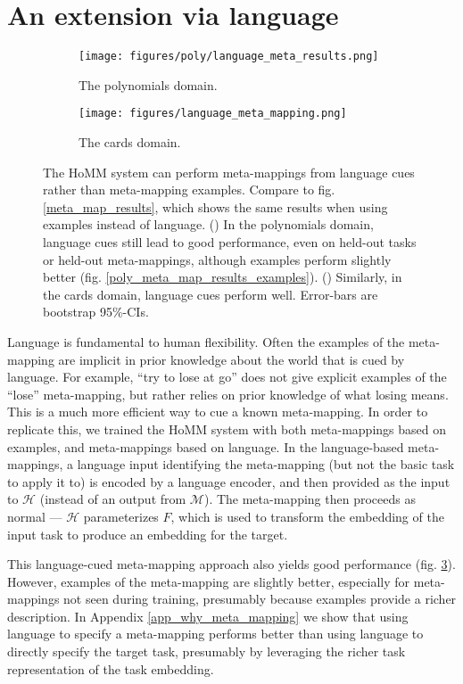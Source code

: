 \documentclass{article}
\begin{document}
\section{An extension via language}
\begin{figure}
\centering
\begin{subfigure}{0.5\textwidth}
\texttt{[image: figures/poly/language\_meta\_results.png]}
\caption{The polynomials domain.}
\label{poly_meta_map_results_language}
\end{subfigure}%
\begin{subfigure}{0.5\textwidth}
\texttt{[image: figures/language\_meta\_mapping.png]}
\caption{The cards domain.}
\label{cards_meta_map_results_language}
\end{subfigure}
\caption{The HoMM system can perform meta-mappings from language cues rather than meta-mapping examples. Compare to fig. \ref{meta_map_results}, which shows the same results when using examples instead of language. () In the polynomials domain, language cues still lead to good performance, even on held-out tasks or held-out meta-mappings, although examples perform slightly better (fig. \ref{poly_meta_map_results_examples}). () Similarly, in the cards domain, language cues perform well. Error-bars are bootstrap 95\%-CIs.}
\label{language_meta_map_results}
\end{figure}
Language is fundamental to human flexibility. Often the examples of the meta-mapping are implicit in prior knowledge about the world that is cued by language. For example, ``try to lose at go'' does not give explicit examples of the ``lose'' meta-mapping, but rather relies on prior knowledge of what losing means. This is a much more efficient way to cue a known meta-mapping. In order to replicate this, we trained the HoMM system with both meta-mappings based on examples, and meta-mappings based on language. In the language-based meta-mappings, a language input identifying the meta-mapping (but not the basic task to apply it to) is encoded by a language encoder, and then provided as the input to $\mathcal{H}$ (instead of an output from $\mathcal{M}$). The meta-mapping then proceeds as normal --- $\mathcal{H}$ parameterizes $F$, which is used to transform the embedding of the input task to produce an embedding for the target. \par
This language-cued meta-mapping approach also yields good performance (fig. \ref{language_meta_map_results}). However, examples of the meta-mapping are slightly better, especially for meta-mappings not seen during training, presumably because examples provide a richer description. In Appendix \ref{app_why_meta_mapping} we show that using language to specify a meta-mapping performs better than using language to directly specify the target task, presumably by leveraging the richer task representation of the task embedding. \par
\end{document}
